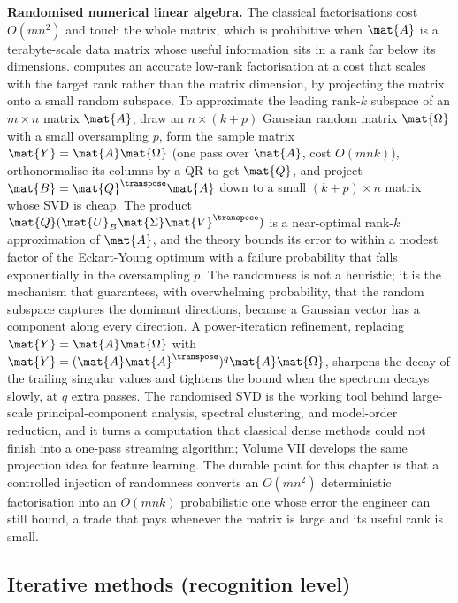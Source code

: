 \begin{mastery}
\textbf{Randomised numerical linear algebra.} The classical factorisations
cost $O(mn^{2})$ and touch the whole matrix, which is prohibitive when
$\mat{A}$ is a terabyte-scale data matrix whose useful information sits in a
rank far below its dimensions. 
computes an accurate low-rank factorisation at a cost that scales with the
target rank rather than the matrix dimension, by projecting the matrix onto a
small random subspace. To approximate the leading rank-$k$ subspace of an
$m \times n$ matrix $\mat{A}$, draw an $n \times (k + p)$ Gaussian random
matrix $\mat{\Omega}$ with a small oversampling $p$, form the sample matrix
$\mat{Y} = \mat{A}\mat{\Omega}$ (one pass over $\mat{A}$, cost $O(mnk)$),
orthonormalise its columns by a QR to get $\mat{Q}$, and project $\mat{B} =
\mat{Q}^{\transpose}\mat{A}$ down to a small $(k+p) \times n$ matrix whose SVD
is cheap. The product $\mat{Q}(\mat{U}_{B}\mat{\Sigma}\mat{V}^{\transpose})$ is
a near-optimal rank-$k$ approximation of $\mat{A}$, and the theory bounds its
error to within a modest factor of the Eckart-Young optimum with a failure
probability that falls exponentially in the oversampling $p$. The randomness
is not a heuristic; it is the mechanism that guarantees, with overwhelming
probability, that the random subspace captures the dominant directions, because
a Gaussian vector has a component along every direction. A power-iteration
refinement, replacing $\mat{Y} = \mat{A}\mat{\Omega}$ with $\mat{Y} =
(\mat{A}\mat{A}^{\transpose})^{q}\mat{A}\mat{\Omega}$, sharpens the decay of
the trailing singular values and tightens the bound when the spectrum decays
slowly, at $q$ extra passes. The randomised SVD is the working tool behind
large-scale principal-component analysis, spectral clustering, and model-order
reduction, and it turns a computation that classical dense methods could not
finish into a one-pass streaming algorithm; Volume VII develops the same
projection idea for feature learning. The durable point for this chapter is
that a controlled injection of randomness converts an $O(mn^{2})$ deterministic
factorisation into an $O(mnk)$ probabilistic one whose error the engineer can
still bound, a trade that pays whenever the matrix is large and its useful rank
is small.
\end{mastery}

\subsection{Iterative methods (recognition level)}

